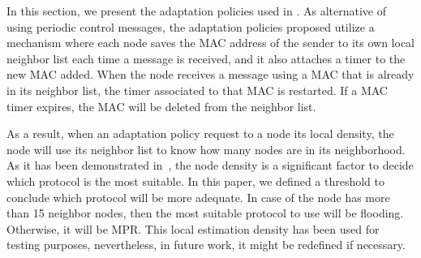 


In this section, we present the adaptation policies used in .
As alternative of using periodic control messages, the adaptation policies proposed utilize a mechanism where each node saves the MAC address of the sender to its own local neighbor list each time a message is received, and it also attaches a timer to the new MAC added.
When the node receives a message using a MAC that is already in its neighbor list, the timer associated to that MAC is restarted.
If a MAC timer expires, the MAC will be deleted from the neighbor list.

As a result, when an adaptation policy request to a node its local density, the node will use its neighbor list to know how many nodes are in its neighborhood.
As it has been demonstrated in~\cite{DensityMobDrivenEval}, the node density is a significant factor to decide which protocol is the most suitable.
In this paper, we defined a threshold to conclude which protocol will be more adequate.
In case of the node has more than 15 neighbor nodes, then the most suitable protocol to use will be flooding. Otherwise, it will be MPR.
This local estimation density has been used for testing purposes, nevertheless, in future work, it might be redefined if necessary.





